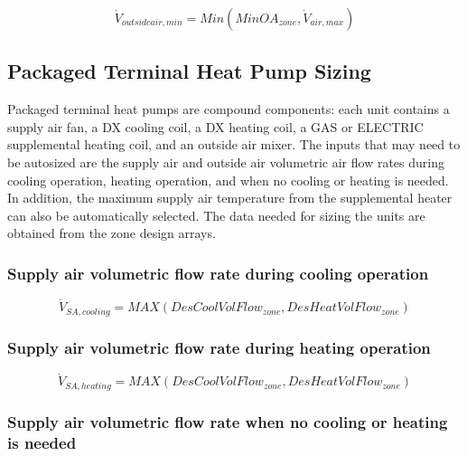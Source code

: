 \begin{equation}
{\dot V_{outsideair,min}} = Min\left( {MinO{A_{zone}},{{\dot V}_{air,max}}} \right)
\end{equation}

\subsection{Packaged Terminal Heat Pump Sizing}\label{packaged-terminal-heat-pump-sizing}

Packaged terminal heat pumps are compound components: each unit contains a supply air fan, a DX cooling coil, a DX heating coil, a GAS or ELECTRIC supplemental heating coil, and an outside air mixer. The inputs that may need to be autosized are the supply air and outside air volumetric air flow rates during cooling operation, heating operation, and when no cooling or heating is needed. In addition, the maximum supply air temperature from the supplemental heater can also be automatically selected. The data needed for sizing the units are obtained from the zone design arrays.

\subsubsection{Supply air volumetric flow rate during cooling operation}\label{supply-air-volumetric-flow-rate-during-cooling-operation}

\begin{equation}
\dot V_{SA,cooling} = MAX(DesCoolVolFlow_{zone},DesHeatVolFlow_{zone})
\end{equation}

\subsubsection{Supply air volumetric flow rate during heating operation}\label{supply-air-volumetric-flow-rate-during-heating-operation}

\begin{equation}
\dot V_{SA,heating}  = MAX(DesCoolVolFlow_{zone},DesHeatVolFlow_{zone})
\end{equation}

\subsubsection{Supply air volumetric flow rate when no cooling or heating is needed}\label{supply-air-volumetric-flow-rate-when-no-cooling-or-heating-is-needed}

